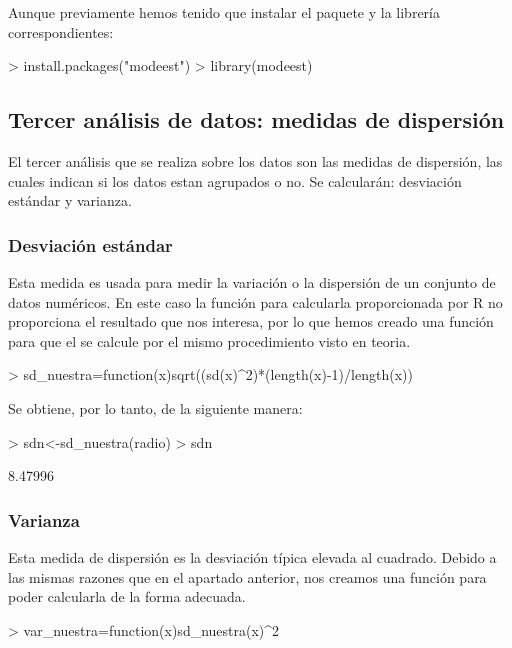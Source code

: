 \documentclass [a4paper] {article}
\begin{document}
Aunque previamente hemos tenido que instalar el paquete y la librería correspondientes:

\begin{Schunk}
\begin{Sinput}
> install.packages("modeest")
> library(modeest)
\end{Sinput}
\end{Schunk}


\subsection{Tercer análisis de datos: medidas de dispersión}
El tercer análisis que se realiza sobre los datos son las medidas de dispersión, las cuales indican si los datos 
estan agrupados o no. Se calcularán: desviación estándar y varianza.
\subsubsection{Desviación estándar}
Esta medida es usada para medir la variación o la dispersión de un conjunto de datos numéricos. 
En este caso la función para calcularla proporcionada por R no proporciona el resultado que nos interesa, 
por lo que hemos creado una función para que el se calcule por el mismo procedimiento visto en teoria.
\begin{Schunk}
\begin{Sinput}
> sd_nuestra=function(x){sqrt((sd(x)^2)*(length(x)-1)/length(x))}
\end{Sinput}
\end{Schunk}
Se obtiene, por lo tanto, de la siguiente manera:
\begin{Schunk}
\begin{Sinput}
> sdn<-sd_nuestra(radio)
> sdn
\end{Sinput}
\begin{Soutput}
[1] 8.47996
\end{Soutput}
\end{Schunk}
\subsubsection{Varianza}
Esta medida de dispersión es la desviación típica elevada al cuadrado. Debido a las mismas razones que en el apartado anterior, nos creamos una función para poder calcularla de la forma adecuada.

\begin{Schunk}
\begin{Sinput}
> var_nuestra=function(x){sd_nuestra(x)^2}
\end{Sinput}
\end{Schunk}
\end{document}
